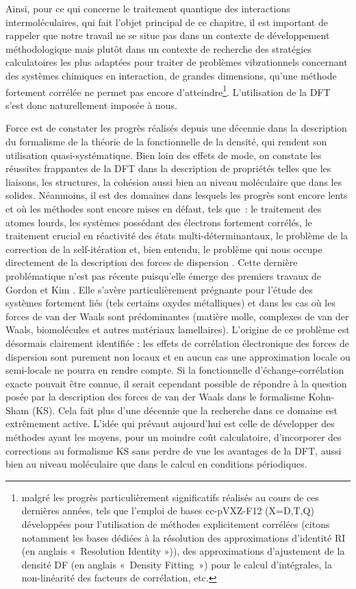 	Ainsi, pour ce qui concerne le traitement quantique des interactions intermoléculaires, qui fait l’objet principal de ce chapitre, il est important de rappeler que notre travail ne se situe pas dans un contexte de développement méthodologique mais plutôt dans un contexte de recherche des stratégies calculatoires les plus adaptées pour traiter de problèmes vibrationnels concernant des systèmes chimiques en interaction, de grandes dimensions, qu’une méthode fortement corrélée ne permet pas encore d’atteindre\footnote{malgré les progrès particulièrement significatifs réalisés au cours de ces dernières années, tels que l’emploi de bases cc-pVXZ-F12 (X=D,T,Q) développées pour l’utilisation de méthodes explicitement corrélées (citons notamment les bases dédiées à la résolution des approximations d'identité RI (en anglais « Resolution Identity »)), des approximations d'ajustement de la densité DF (en anglais « Density Fitting ») pour le calcul d’intégrales, la non-linéarité des facteurs de corrélation, etc.}. L’utilisation de la DFT s’est donc naturellement imposée à nous.
	
	Force est de constater les progrès réalisés depuis une décennie dans la description du formalisme de la théorie de la fonctionnelle de la densité, qui rendent son utilisation quasi-systématique. Bien loin des effets de mode, on constate les réussites frappantes de la DFT dans la description de propriétés telles que les liaisons, les structures, la cohésion aussi bien au niveau moléculaire que dans les solides. Néanmoins, il est des domaines dans lesquels les progrès sont encore lents et où les méthodes sont encore mises en défaut, tels que : le traitement des atomes lourds, les systèmes possédant des électrons fortement corrélés, le traitement crucial en réactivité des états multi-déterminantaux, le problème de la correction de la self-itération et, bien entendu, le problème qui nous occupe directement de la description des forces de dispersion \cite{gerber2005description}. Cette dernière problématique n’est pas récente puisqu'elle émerge des premiers travaux de Gordon et Kim \cite{gordon1972theory}. Elle s’avère particulièrement prégnante pour l’étude des systèmes fortement liés (tels certains oxydes métalliques) et dans les cas où les forces de van der Waals sont prédominantes (matière molle, complexes de van der Waals, biomolécules et autres matériaux lamellaires). L’origine de ce problème est désormais clairement identifiée : les effets de corrélation électronique des forces de dispersion sont purement non locaux et en aucun cas une approximation locale ou semi-locale ne pourra en rendre compte. Si la fonctionnelle d’échange-corrélation exacte pouvait être connue, il serait cependant possible de répondre à la question posée par la description des forces de van der Waals dans le formalisme Kohn-Sham (KS). Cela fait plus d’une décennie que la recherche dans ce domaine est extrêmement active. L’idée qui prévaut aujourd’hui est celle de développer des méthodes ayant les moyens, pour un moindre coût calculatoire, d’incorporer des corrections au formalisme KS sans perdre de vue les avantages de la DFT, aussi bien au niveau moléculaire que dans le calcul en conditions périodiques. 
	
